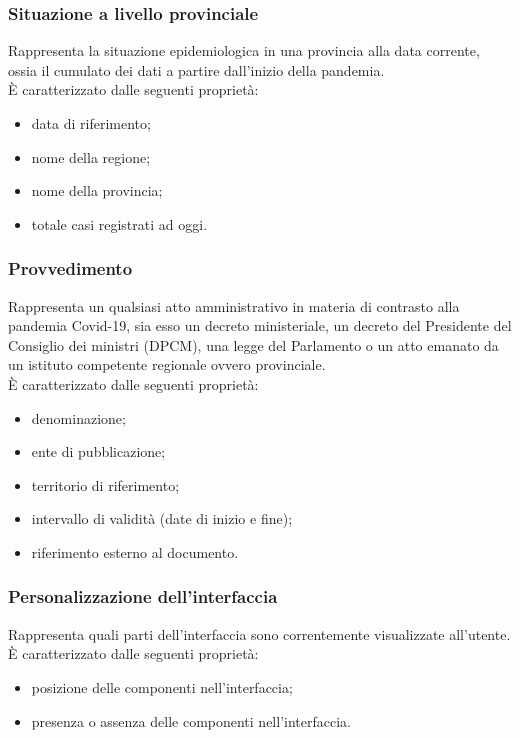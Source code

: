 \subsubsection{Situazione a livello provinciale}
\label{sss:situazione-livello-provinciale}
Rappresenta la situazione epidemiologica in una provincia alla data corrente, ossia il cumulato dei dati a partire dall'inizio della pandemia.\\
È caratterizzato dalle seguenti proprietà:
\begin{itemize}
    \item data di riferimento;
    \item nome della regione;
    \item nome della provincia;
    \item totale casi registrati ad oggi.
\end{itemize}

\subsubsection{Provvedimento}
\label{sss:provvedimento}
Rappresenta un qualsiasi atto amministrativo in materia di contrasto alla pandemia Covid-19, sia esso un decreto ministeriale, un decreto del Presidente del Consiglio dei ministri (DPCM), una legge del Parlamento o un atto emanato da un istituto competente regionale ovvero provinciale.\\
È caratterizzato dalle seguenti proprietà:
\begin{itemize}
    \item denominazione;
    \item ente di pubblicazione;
    \item territorio di riferimento;
    \item intervallo di validità (date di inizio e fine);
    \item riferimento esterno al documento.
\end{itemize}

\subsubsection{Personalizzazione dell'interfaccia}
\label{sss:personalizzazione-interfaccia}
Rappresenta quali parti dell'interfaccia sono correntemente visualizzate all'utente.\\
È caratterizzato dalle seguenti proprietà:
\begin{itemize}
    \item posizione delle componenti nell'interfaccia;
    \item presenza o assenza delle componenti nell'interfaccia.
\end{itemize}
